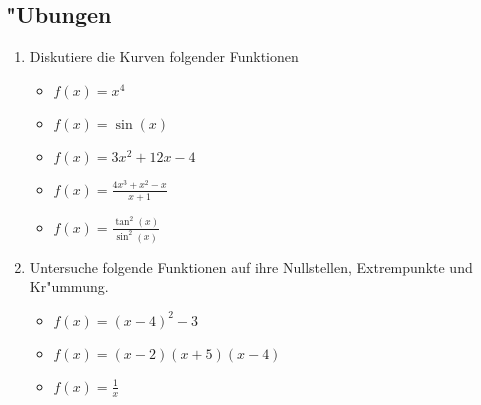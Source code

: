  \subsection{"Ubungen}
 \begin{enumerate}
 \item Diskutiere die Kurven folgender Funktionen
 \begin{itemize}
 \item $f(x)=x^4$
 \item $f(x)=\sin(x)$
 \item $f(x)=3x^2 + 12x - 4$
 \item $f(x)=\frac{4x^3 + x^2 - x}{x+1}$
 \item $f(x)=\frac{\tan^2(x)}{\sin^2(x)}$
 \end{itemize}
 \item Untersuche folgende Funktionen auf ihre Nullstellen, Extrempunkte und Kr"ummung.
 \begin{itemize}
 \item $f(x)=(x-4)^2-3$
 \item $f(x)=(x-2)(x+5)(x-4)$
 \item $f(x)=\frac{1}{x}$
 \end{itemize}
 \end{enumerate}
 
 